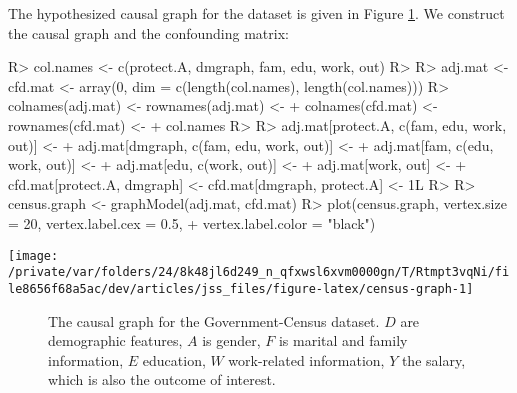 \documentclass[
  notitle]{jss}
\begin{document}
The hypothesized causal graph for the dataset is given in Figure
\ref{fig:censusgraph}. We construct the causal graph and the confounding
matrix:

\begin{CodeChunk}
\begin{CodeInput}
R> col.names <- c(protect.A, dmgraph, fam, edu, work, out)
R> 
R> adj.mat <- cfd.mat <- array(0, dim = c(length(col.names), length(col.names)))
R> colnames(adj.mat) <- rownames(adj.mat) <-
+   colnames(cfd.mat) <- rownames(cfd.mat) <-
+   col.names
R> 
R> adj.mat[protect.A, c(fam, edu, work, out)] <-
+   adj.mat[dmgraph, c(fam, edu, work, out)] <-
+   adj.mat[fam, c(edu, work, out)] <-
+   adj.mat[edu, c(work, out)] <-
+   adj.mat[work, out] <-
+   cfd.mat[protect.A, dmgraph] <- cfd.mat[dmgraph, protect.A] <- 1L
R> 
R> census.graph <- graphModel(adj.mat, cfd.mat)
R> plot(census.graph, vertex.size = 20, vertex.label.cex = 0.5,
+   vertex.label.color = "black")
\end{CodeInput}


\begin{center}\texttt{[image: /private/var/folders/24/8k48jl6d249\_n\_qfxwsl6xvm0000gn/T/Rtmpt3vqNi/file8656f68a5ac/dev/articles/jss\_files/figure-latex/census-graph-1]} \end{center}

\end{CodeChunk}

\begin{figure} \centering
    \caption{The causal graph for the Government-Census dataset. $D$ are demographic features, $A$ is gender, $F$ is marital and family information, $E$ education, $W$ work-related information, $Y$ the salary, which is also the outcome of interest.}
    \label{fig:censusgraph}
\end{figure}
\end{document}
